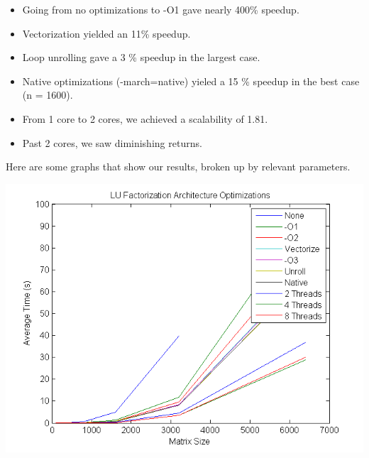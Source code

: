 \documentclass[12]{article}
\begin{document}
\begin{itemize}
\setlength\itemsep{0.25em}
\item Going from no optimizations to -O1 gave nearly 400\% speedup.  
\item Vectorization yielded an 11\% speedup.
\item Loop unrolling gave a 3 \% speedup in the largest case.
\item Native optimizations (-march=native) yieled a 15 \% speedup in the best case (n = 1600).  
\item From 1 core to 2 cores, we achieved a scalability of 1.81. 
\item Past 2 cores, we saw diminishing returns.  
\end{itemize}

Here are some graphs that show our results, broken up by relevant parameters.  

\includegraphics[scale=1]{figures/fig1}
\end{document}
